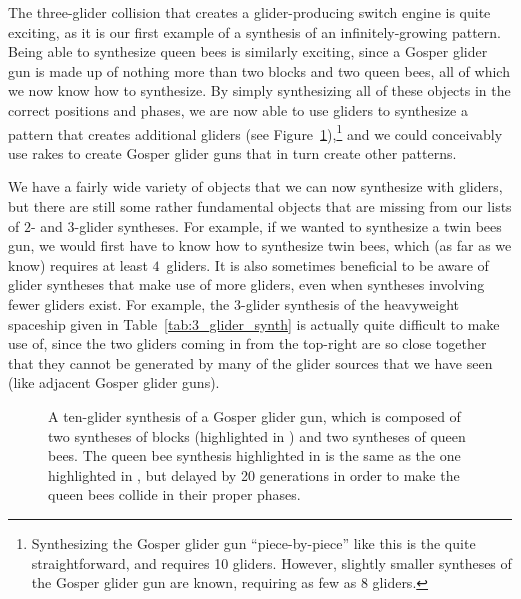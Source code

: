 The three-glider collision that creates a glider-producing switch engine is quite exciting, as it is our first example of a synthesis of an infinitely-growing pattern. Being able to synthesize queen bees is similarly exciting, since a Gosper glider gun is made up of nothing more than two blocks and two queen bees, all of which we now know how to synthesize. By simply synthesizing all of these objects in the correct positions and phases, we are now able to use gliders to synthesize a pattern that creates additional gliders (see Figure~\ref{fig:gosper_glider_synth}),\footnote{Synthesizing the Gosper glider gun ``piece-by-piece'' like this is the quite straightforward, and requires 10 gliders. However, slightly smaller syntheses of the Gosper glider gun are known, requiring as few as 8 gliders.} and we could conceivably use rakes to create Gosper glider guns that in turn create other patterns.

We have a fairly wide variety of objects that we can now synthesize with gliders, but there are still some rather fundamental objects that are missing from our lists of $2$- and $3$-glider syntheses. For example, if we wanted to synthesize a twin bees gun, we would first have to know how to synthesize twin bees, which (as far as we know) requires at least $4$~gliders. It is also sometimes beneficial to be aware of glider syntheses that make use of more gliders, even when syntheses involving fewer gliders exist. For example, the $3$-glider synthesis of the heavyweight spaceship given in Table~\ref{tab:3_glider_synth} is actually quite difficult to make use of, since the two gliders coming in from the top-right are so close together that they cannot be generated by many of the glider sources that we have seen (like adjacent Gosper glider guns).

\begin{figure}[!htb]
	\centering{}
	\caption{A ten-glider synthesis of a Gosper glider gun, which is composed of two syntheses of blocks (highlighted in ) and two syntheses of queen bees. The queen bee synthesis highlighted in  is the same as the one highlighted in , but delayed by 20 generations in order to make the queen bees collide in their proper phases.}\label{fig:gosper_glider_synth}
\end{figure}

